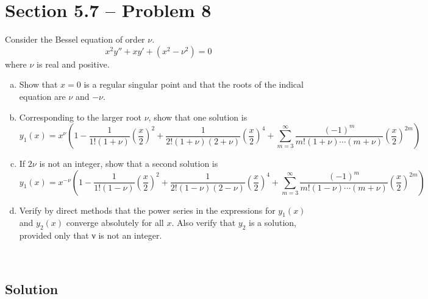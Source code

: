 \documentclass{article}
\theoremstyle{definition}
\begin{document}
\section*{Section 5.7 -- Problem 8}
    Consider the Bessel equation of order $\nu$.
    \[
    x^2 y'' + x y' + (x^2 - \nu^2) = 0
    \] 
    where $\nu$ is real and positive.
    \begin{enumerate}[a.]
        \item Show that $x = 0$ is a regular singular point and that the roots of the indical equation are $\nu$ and $-\nu$.
        \item Corresponding to the larger root $\nu$, show that one solution is 
        \[
        y_1(x) = x^\nu \left(
1 - \frac{1}{1!(1+\nu)}\left(\frac{x}{2}\right)^2 + 
\frac{1}{2!(1+\nu)(2+\nu)}\left(\frac{x}{2}\right)^4 +
\sum_{m=3}^{\infty} \frac{(-1)^m}{m!(1+\nu)\cdots(m+\nu)}\left(\frac{x}{2}\right)^{2m}
        \right)
        \] 
        \item If $2\nu$ is not an integer, show that a second solution is
        \[
        y_1(x) = x^{-\nu} \left(
1 - \frac{1}{1!(1-\nu)}\left(\frac{x}{2}\right)^2 + 
\frac{1}{2!(1-\nu)(2-\nu)}\left(\frac{x}{2}\right)^4 +
\sum_{m=3}^{\infty} \frac{(-1)^m}{m!(1-\nu)\cdots(m+\nu)}\left(\frac{x}{2}\right)^{2m}
        \right)
        \] 
        \item Verify by direct methods that the power series in the expressions for $y_1(x)$ and $y_2(x)$ converge absolutely for all $x$. Also verify that $y_2$ is a solution, provided only that ν is not an integer.
    \end{enumerate}
    \\ \hline
    \subsection*{Solution}
\end{document}
